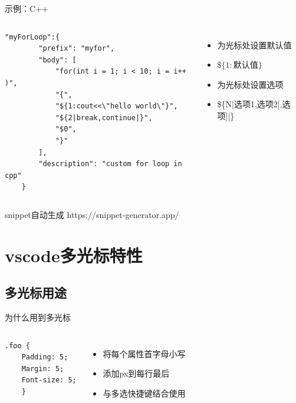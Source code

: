 \documentclass{beamer}
\begin{document}
\begin{frame}[fragile]{示例：C++}
    \begin{columns}

        \begin{lstlisting}[language=Tex,basicstyle=\tiny]
    "myForLoop":{
        "prefix": "myfor",
        "body": [
            "for(int i = 1; i < 10; i = i++ )",
            "{",
            "${1:cout<<\"hello world\"}",
            "${2|break,continue|}",
            "$0",
            "}"
        ],
        "description": "custom for loop in cpp"
    }
    \end{lstlisting}
        \begin{itemize}
            \item 为光标处设置默认值
            \item $\$\{1:\text{默认值}\}$
            \item 为光标处设置选项
            \item \$\{N|选项1,选项2[,选项]|\}
        \end{itemize}
    \end{columns}
\end{frame}

\begin{frame}{snippet自动生成}
    https://snippet-generator.app/
\end{frame}

\section{vscode多光标特性}
\subsection{多光标用途}

\begin{frame}[fragile]{为什么用到多光标}
    \begin{columns}

        \begin{lstlisting}[language=Html,basicstyle=\small]
.foo {
    Padding: 5;
    Margin: 5;
    Font-size: 5;
    }
    \end{lstlisting}

        \begin{itemize}
            \item 将每个属性首字母小写
            \item 添加px到每行最后
            \item  {\color{red} 与多选快捷键结合使用}
        \end{itemize}

    \end{columns}
\end{frame}
\end{document}
